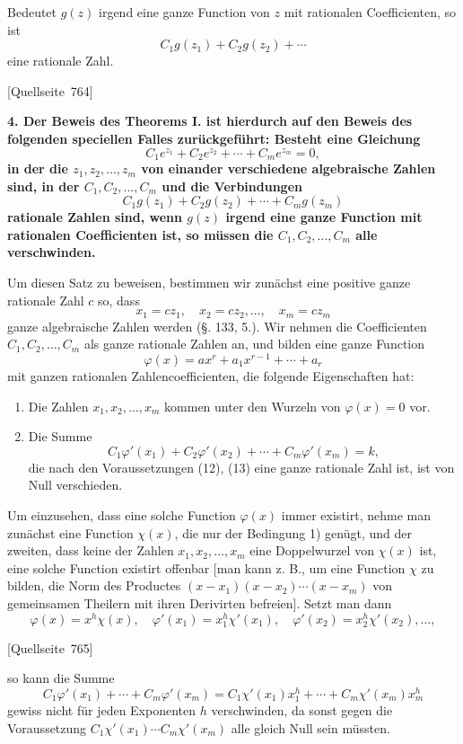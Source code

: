 \documentclass[11pt]{article}
\newcommand{\srcpage}[1]{\par\medskip\noindent\textsf{[Quellseite~#1]}\par\smallskip}
\begin{document}
Bedeutet $g(z)$ irgend eine ganze Function von $z$ mit rationalen Coefficienten, so ist
\[
C_1g(z_1)+C_2g(z_2)+\cdots
\]
eine rationale Zahl.

\srcpage{764}
\textbf{4. Der Beweis des Theorems I. ist hierdurch auf den Beweis des folgenden speciellen Falles zurückgeführt: Besteht eine Gleichung}
\begin{equation}\tag{11}
C_1e^{z_1}+C_2e^{z_2}+\cdots+C_me^{z_m}=0,
\end{equation}
\textbf{in der die $z_1,z_2,\ldots,z_m$ von einander verschiedene algebraische Zahlen sind, in der $C_1,C_2,\ldots,C_m$ und die Verbindungen}
\begin{equation}\tag{12}
C_1g(z_1)+C_2g(z_2)+\cdots+C_mg(z_m)
\end{equation}
\textbf{rationale Zahlen sind, wenn $g(z)$ irgend eine ganze Function mit rationalen Coefficienten ist, so müssen die $C_1,C_2,\ldots,C_m$ alle verschwinden.}

Um diesen Satz zu beweisen, bestimmen wir zunächst eine positive ganze rationale Zahl $c$ so, dass
\begin{equation}\tag{13}
x_1=cz_1,\quad x_2=cz_2,\ldots,\quad x_m=cz_m
\end{equation}
ganze algebraische Zahlen werden (§. 133, 5.). Wir nehmen die Coefficienten $C_1,C_2,\ldots,C_m$ als ganze rationale Zahlen an, und bilden eine ganze Function
\begin{equation}\tag{14}
\varphi(x)=ax^r+a_1x^{r-1}+\cdots+a_r
\end{equation}
mit ganzen rationalen Zahlencoefficienten, die folgende Eigenschaften hat:
\begin{enumerate}[label=\arabic*)]
\item Die Zahlen $x_1,x_2,\ldots,x_m$ kommen unter den Wurzeln von $\varphi(x)=0$ vor.
\item Die Summe
\[
C_1\varphi'(x_1)+C_2\varphi'(x_2)+\cdots+C_m\varphi'(x_m)=k,
\]
die nach den Voraussetzungen (12), (13) eine ganze rationale Zahl ist, ist von Null verschieden.
\end{enumerate}

Um einzusehen, dass eine solche Function $\varphi(x)$ immer existirt, nehme man zunächst eine Function $\chi(x)$, die nur der Bedingung 1) genügt, und der zweiten, dass keine der Zahlen $x_1,x_2,\ldots,x_m$ eine Doppelwurzel von $\chi(x)$ ist, eine solche Function existirt offenbar [man kann z. B., um eine Function $\chi$ zu bilden, die Norm des Productes $(x-x_1)(x-x_2)\cdots(x-x_m)$ von gemeinsamen Theilern mit ihren Derivirten befreien]. Setzt man dann
\[
\varphi(x)=x^h\chi(x),\quad
\varphi'(x_1)=x_1^h\chi'(x_1),\quad
\varphi'(x_2)=x_2^h\chi'(x_2),\ldots,
\]
\srcpage{765}
so kann die Summe
\[
C_1\varphi'(x_1)+\cdots+C_m\varphi'(x_m)
=
C_1\chi'(x_1)x_1^h+\cdots+C_m\chi'(x_m)x_m^h
\]
gewiss nicht für jeden Exponenten $h$ verschwinden, da sonst gegen die Voraussetzung $C_1\chi'(x_1)\cdots C_m\chi'(x_m)$ alle gleich Null sein müssten.
\end{document}
